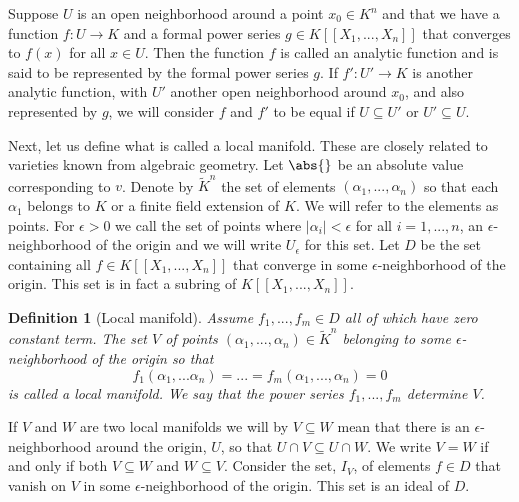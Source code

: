 \documentclass{article}
\newtheorem{definition}{Definition}[section]
\begin{document}
Suppose $U$ is an open neighborhood around a point $x_0 \in K^n$ and that we have a function $f : U \to K$ and a formal power series $g \in K[[X_1, ..., X_n]]$ that converges to $f(x)$ for all $x \in U$. Then the function $f$ is called an analytic function and is said to be represented by the formal power series $g$. If $f' : U' \to K$ is another analytic function, with $U'$ another open neighborhood around $x_0$, and also represented by $g$, we will consider $f$ and $f'$ to be equal if $U \subseteq U'$ or $U' \subseteq U$.


Next, let us define what is called a local manifold. These are closely related to varieties known from algebraic geometry. Let $\abs{}$ be an absolute value corresponding to $v$. Denote by $\tilde K^n$ the set of elements $(\alpha_1, ..., \alpha_n)$ so that each $\alpha_1$ belongs to $K$ or a finite field extension of $K$. We will refer to the elements as points. For $\epsilon > 0$ we call the set of points where $|\alpha_i| < \epsilon$ for all $i = 1, ..., n$, an $\epsilon$-neighborhood of the origin and we will write $U_\epsilon$ for this set. 
Let $D$ be the set containing all $f \in K[[X_1, ..., X_n]]$ that converge in some $\epsilon$-neighborhood of the origin. This set is in fact a subring of $K[[X_1, ..., X_n]]$.

\begin{definition}[Local manifold]
    Assume $f_1, ..., f_m \in D$ all of which have zero constant term. The set $V$ of points $(\alpha_1, ..., \alpha_n) \in \tilde {K}^n$ belonging to some $\epsilon$-neighborhood of the origin so that $$f_1(\alpha_1, ... \alpha_n) = ... = f_m(\alpha_1, ..., \alpha_n) = 0$$
    is called a local manifold. We say that the power series $f_1, ..., f_m$ determine $V$. 
\end{definition}
If $V$ and $W$ are two local manifolds we will by $V \subseteq W$ mean that there is an $\epsilon$-neighborhood around the origin, $U$, so that $U \cap V \subseteq U \cap W$. We write $V = W$ if and only if both $V \subseteq W$ and $W \subseteq V$.  
Consider the set, $I_V$, of elements $f \in D$ that vanish on $V$ in some $\epsilon$-neighborhood of the origin. This set is an ideal of $D$.
\end{document}
